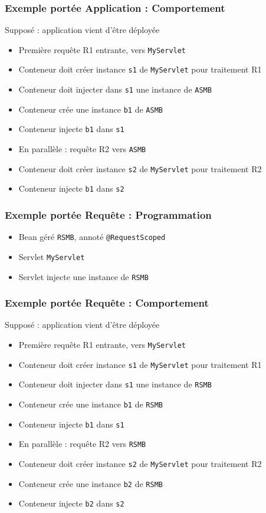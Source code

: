 \documentclass[english, french]{beamer}
\begin{document}
\begin{frame}
	\frametitle{Exemple portée Application : Comportement}
	Supposé : application vient d’être déployée
	\begin{itemize}
		\item Première requête R1 entrante, vers \texttt{MyServlet}
		\item \pause Conteneur doit créer instance \texttt{s1} de \texttt{MyServlet} pour traitement R1
		\item \pause Conteneur doit injecter dans \texttt{s1} une instance de \texttt{ASMB}
		\item \pause Conteneur crée une instance \texttt{b1} de \texttt{ASMB}
		\item \pause Conteneur injecte \texttt{b1} dans \texttt{s1} 
		\item En parallèle : requête R2 vers \texttt{ASMB}
		\item \pause Conteneur doit créer instance \texttt{s2} de \texttt{MyServlet} pour traitement R2
		\item \pause Conteneur injecte \texttt{b1} dans \texttt{s2}
	\end{itemize}
\end{frame}

\begin{frame}
	\frametitle{Exemple portée Requête : Programmation}
	\begin{itemize}
		\item Bean géré \texttt{RSMB}, annoté \texttt{@RequestScoped}
		\item Servlet \texttt{MyServlet}
		\item Servlet injecte une instance de \texttt{RSMB}
	\end{itemize}
\end{frame}

\begin{frame}
	\frametitle{Exemple portée Requête : Comportement}
	Supposé : application vient d’être déployée
	\begin{itemize}
		\item Première requête R1 entrante, vers \texttt{MyServlet}
		\item \pause Conteneur doit créer instance \texttt{s1} de \texttt{MyServlet} pour traitement R1
		\item \pause Conteneur doit injecter dans \texttt{s1} une instance de \texttt{RSMB}
		\item \pause Conteneur crée une instance \texttt{b1} de \texttt{RSMB}
		\item \pause Conteneur injecte \texttt{b1} dans \texttt{s1} 
		\item En parallèle : requête R2 vers \texttt{RSMB}
		\item \pause Conteneur doit créer instance \texttt{s2} de \texttt{MyServlet} pour traitement R2
		\item \pause Conteneur crée une instance \texttt{b2} de \texttt{RSMB}
		\item \pause Conteneur injecte \texttt{b2} dans \texttt{s2}
	\end{itemize}
\end{frame}
\end{document}
